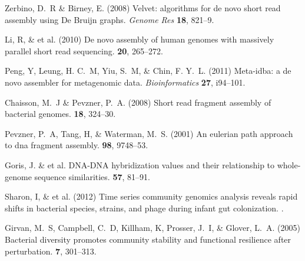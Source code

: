 \documentclass{pnastwo}
\begin{document}
\begin{article}
\begin{thebibliography}{10}
 Zerbino, D.~R \& Birney, E. \newblock (2008) Velvet:
algorithms for de novo short read assembly using De Bruijn graphs. \newblock
{\em Genome Res} {\bf 18}, 821--9.

 Li, R, \& et al. \newblock
(2010) {De novo assembly of human genomes with massively parallel short read
sequencing}.  {\bf 20}, 265--272.


 Peng, Y, Leung, H. C.~M, Yiu, S.~M, \& Chin, F. Y.~L.
\newblock (2011) Meta-idba: a de novo assembler for metagenomic data. \newblock
{\em Bioinformatics} {\bf 27}, i94--101.

 Chaisson, M.~J \& Pevzner, P.~A. \newblock (2008)
Short read fragment assembly of bacterial genomes.  {\bf 18}, 324--30.

 Pevzner, P.~A, Tang, H, \& Waterman, M.~S. \newblock
(2001) An eulerian path approach to dna fragment assembly.  {\bf 98}, 9748--53.

 Goris, J. \& et al. DNA-DNA hybridization values and their relationship to whole-genome
sequence similarities.  {\bf 57}, 81--91.

 Sharon, I, \& et al. \newblock (2012) {Time series community
genomics analysis reveals rapid shifts in bacterial species, strains, and phage
during infant gut colonization}. .


 Girvan, M.~S, Campbell, C.~D, Killham, K, Prosser, J.~I,
\& Glover, L.~A. \newblock (2005) {Bacterial diversity promotes community
stability and functional resilience after perturbation.}  {\bf 7}, 301--313.


\end{thebibliography}
\end{article}
\end{document}
